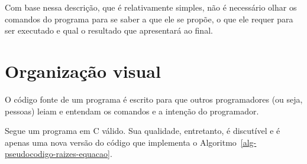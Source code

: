 \documentclass[
  11pt,
  a4paper,
]{scrbook}
\begin{document}
Com base nessa descrição, que é relativamente simples, não é necessário
olhar os comandos do programa para se saber a que ele se propõe, o que
ele requer para ser executado e qual o resultado que apresentará ao
final.

\section{Organização visual}\label{organizauxe7uxe3o-visual}

O código fonte de um programa é escrito para que outros programadores
(ou seja, pessoas) leiam e entendam os comandos e a intenção do
programador.

Segue um programa em C válido. Sua qualidade, entretanto, é discutível e
é apenas uma nova versão do código que implementa o
Algoritmo~\ref{alg-pseudocodigo-raizes-equacao}.
\end{document}
